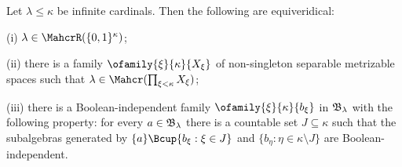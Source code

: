  Let
$\lambda\le\kappa$ be infinite cardinals.   Then the following are
equiveridical:

(i) $\lambda\in\MahcrR(\{0,1\}^{\kappa})$;

(ii) there is a family $\ofamily{\xi}{\kappa}{X_{\xi}}$ of non-singleton
separable metrizable spaces such that
$\lambda\in\Mahcr(\prod_{\xi<\kappa}X_{\xi})$;

(iii) there is a Boolean-independent family
$\ofamily{\xi}{\kappa}{b_{\xi}}$ in
$\frak B_{\lambda}$ with the following property:   for every
$a\in\frak B_{\lambda}$
there is a countable set $J\subseteq\kappa$ such that the subalgebras
generated by $\{a\}\Bcup\{b_{\xi}:\xi\in J\}$ and
$\{b_{\eta}:\eta\in\kappa\setminus J\}$ are Boolean-independent.

